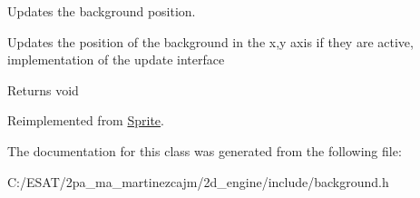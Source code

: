 Updates the background position. 

Updates the position of the background in the x,y axis if they are active, implementation of the update interface

\begin{DoxyReturn}{Returns}
void 
\end{DoxyReturn}


Reimplemented from \hyperlink{class_sprite_a1070fccd6830382b72e3f3a8785afc8c}{Sprite}.



The documentation for this class was generated from the following file\+:\begin{DoxyCompactItemize}
\item 
C\+:/\+E\+S\+A\+T/2pa\+\_\+ma\+\_\+martinezcajm/2d\+\_\+engine/include/background.\+h\end{DoxyCompactItemize}
